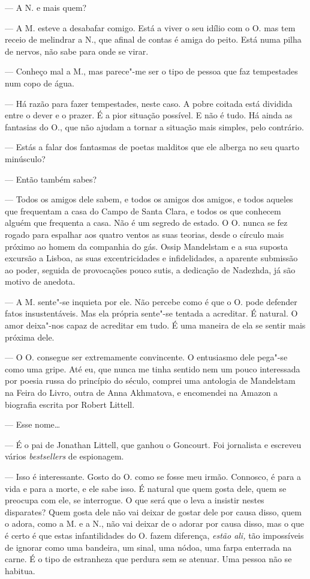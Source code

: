 --- A N. e mais quem?

--- A M. esteve a desabafar comigo. Está a viver o seu idílio com o O. mas
  tem receio de melindrar a N., que afinal de contas é amiga do peito.
  Está numa pilha de nervos, não sabe para onde se virar.

--- Conheço mal a M., mas parece"-me ser o tipo de pessoa que faz
  tempestades num copo de água.

--- Há razão para fazer tempestades, neste caso. A pobre coitada está
  dividida entre o dever e o prazer. É a pior situação possível. E não é
  tudo. Há ainda as fantasias do O., que não ajudam a tornar a situação
  mais simples, pelo contrário.

--- Estás a falar dos fantasmas de poetas malditos que ele alberga no seu
  quarto minúsculo?

--- Então também sabes?

--- Todos os amigos dele sabem, e todos os amigos dos amigos, e todos
  aqueles que frequentam a casa do Campo de Santa Clara, e todos os que
  conhecem alguém que frequenta a casa. Não é um segredo de estado. O O.
  nunca se fez rogado para espalhar aos quatro ventos as suas teorias,
  desde o círculo mais próximo ao homem da companhia do gás. Ossip Mandelstam e a sua suposta excursão a Lisboa, as suas excentricidades e
  infidelidades, a aparente submissão ao poder, seguida de provocações
  pouco sutis, a dedicação de Nadezhda, já são motivo de anedota.

--- A M. sente"-se inquieta por ele. Não percebe como é que o O. pode
  defender fatos insustentáveis. Mas ela própria sente"-se tentada a
  acreditar. É natural. O amor deixa"-nos capaz de acreditar em tudo. É
  uma maneira de ela se sentir
mais próxima dele.

--- O O. consegue ser extremamente convincente. O entusiasmo dele
  pega"-se como uma gripe. Até eu, que nunca me tinha sentido nem um
  pouco interessada por poesia russa do princípio do século, comprei uma
  antologia de Mandelstam na Feira do Livro, outra de Anna Akhmatova, e
  encomendei na Amazon a biografia escrita por Robert Littell.

--- Esse nome\ldots{}

--- É o pai de Jonathan Littell, que ganhou o Goncourt.
Foi jornalista e escreveu vários \emph{bestsellers }de espionagem.

--- Isso é interessante. Gosto do O. como se fosse meu irmão. Connosco, é
  para a vida e para a morte, e ele sabe isso. É natural que quem gosta
  dele, quem se preocupa com ele, se interrogue. O que será que o leva a
  insistir nestes disparates? Quem gosta dele não vai deixar de gostar
  dele por causa disso, quem o adora, como a M. e a N., não vai deixar
  de o adorar por causa disso, mas o que é certo é que estas
  infantilidades do O. fazem diferença, \emph{estão ali, }tão impossíveis de ignorar como
uma bandeira, um sinal, uma nódoa, uma farpa enterrada na carne. É o
tipo de estranheza que perdura sem se atenuar. Uma pessoa não se
habitua.

